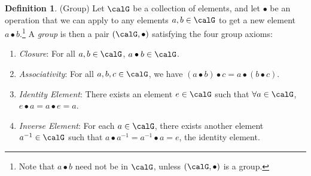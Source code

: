 \documentclass[12pt]{article}
\theoremstyle{plain}
\theoremstyle{definition}
\newtheorem{defn}[thm]{Definition}
\theoremstyle{remark}
\begin{document}
\begin{defn}(Group)
Let $\calG$ be a collection of elements, and let $\bullet$ be an
operation that we can apply to any elements $a,b\in\calG$ to get a new
element $a\bullet b$.\footnote{%
  Note that $a\bullet b$ need not be in $\calG$, unless
  $(\calG,\bullet)$ is a group.
}
A \emph{group} is then a pair $(\calG,\bullet)$ satisfying the four
group axioms:
\begin{enumerate}[label=(\roman*)]
  \item \emph{Closure}: For all $a,b\in\calG$, $a\bullet b\in\calG$.
  \item \emph{Associativity}:
    For all $a,b,c\in\calG$,
    we have $(a\bullet b)\bullet c= a\bullet (b\bullet c)$.
  \item \emph{Identity Element}:
    There exists an element $e\in\calG$ such that $\forall a\in\calG$,
    $e\bullet a=a\bullet e= a$.
  \item \emph{Inverse Element}:
    For each $a\in\calG$, there exists another element $a^{-1}\in\calG$
    such that $a\bullet a^{-1}=a^{-1}\bullet a=e$, the identity element.
\end{enumerate}
\end{defn}
\end{document}
